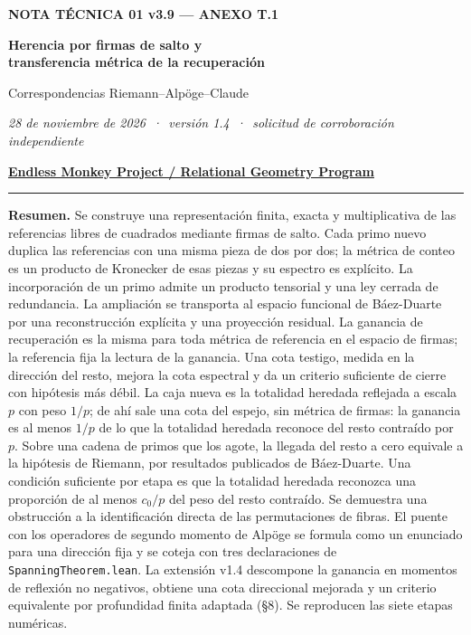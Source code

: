\documentclass[11pt,a4paper]{article}
\theoremstyle{plain}
\begin{document}
\thispagestyle{fancy}
{\color{titulo}\large\bfseries NOTA TÉCNICA 01 v3.9 — ANEXO T.1}\par\vspace{4pt}
{\LARGE\bfseries Herencia por firmas de salto y\\[2pt] transferencia métrica de la recuperación}\par\vspace{4pt}
Correspondencias Riemann–Alpöge–Claude\par
\textit{28 de noviembre de 2026 \,·\, versión 1.4 \,·\, solicitud de corroboración independiente}\par\vspace{2pt}
\textbf{\underline{Endless Monkey Project / Relational Geometry Program}}\par
\vspace{2pt}\hrule\vspace{8pt}

\textbf{Resumen.} Se construye una representación finita, exacta y multiplicativa de las referencias libres de cuadrados mediante firmas de salto. Cada primo nuevo duplica las referencias con una misma pieza de dos por dos; la métrica de conteo es un producto de Kronecker de esas piezas y su espectro es explícito. La incorporación de un primo admite un producto tensorial y una ley cerrada de redundancia. La ampliación se transporta al espacio funcional de Báez-Duarte por una reconstrucción explícita y una proyección residual. La ganancia de recuperación es la misma para toda métrica de referencia en el espacio de firmas; la referencia fija la lectura de la ganancia. Una cota testigo, medida en la dirección del resto, mejora la cota espectral y da un criterio suficiente de cierre con hipótesis más débil. La caja nueva es la totalidad heredada reflejada a escala $p$ con peso $1/p$; de ahí sale una cota del espejo, sin métrica de firmas: la ganancia es al menos $1/p$ de lo que la totalidad heredada reconoce del resto contraído por $p$. Sobre una cadena de primos que los agote, la llegada del resto a cero equivale a la hipótesis de Riemann, por resultados publicados de Báez-Duarte. Una condición suficiente por etapa es que la totalidad heredada reconozca una proporción de al menos $c_0/p$ del peso del resto contraído. Se demuestra una obstrucción a la identificación directa de las permutaciones de fibras. El puente con los operadores de segundo momento de Alpöge se formula como un enunciado para una dirección fija y se coteja con tres declaraciones de \texttt{SpanningTheorem.lean}. La extensión v1.4 descompone la ganancia en momentos de reflexión no negativos, obtiene una cota direccional mejorada y un criterio equivalente por profundidad finita adaptada (§8). Se reproducen las siete etapas numéricas.
\end{document}
